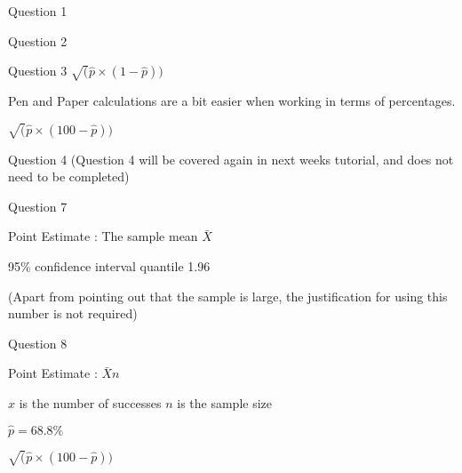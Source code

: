 Question 1


Question 2

Question 3
$\sqrt(\hat{p} \times (1-\hat{p} ))$

Pen and Paper calculations are a bit easier when working in terms of percentages.

$\sqrt(\hat{p} \times (100-\hat{p} ))$

Question 4
(Question 4 will be covered again in next weeks tutorial, and does not need to be completed)













Question 7

Point Estimate : The sample mean $\bar{X}$

95\% confidence interval quantile 1.96 

(Apart from pointing out that the sample is large, the justification for using this number is not required)

Question 8

Point Estimate : $\bar{X}{n}$

$x$ is the number of successes
$n$ is the sample size

$\hat{p} = 68.8\%$


$\sqrt(\hat{p} \times (100-\hat{p} ))$


